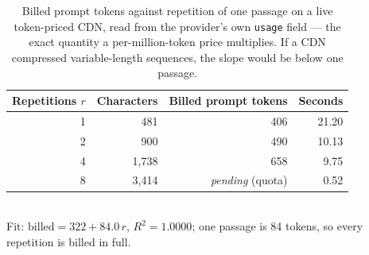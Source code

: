 \begin{table}[htbp]
\centering
\caption{Billed prompt tokens against repetition of one passage on a live
token-priced CDN, read from the provider's own \texttt{usage} field --- the
exact quantity a per-million-token price multiplies. If a CDN compressed
variable-length sequences, the slope would be below one passage.}
\label{tab:cdn}
\begin{tabular}{rrrr}
\toprule
Repetitions $r$ & Characters & Billed prompt tokens & Seconds \\
\midrule
1 & 481 & 406 & 21.20 \\
2 & 900 & 490 & 10.13 \\
4 & 1,738 & 658 & 9.75 \\
8 & 3,414 & \emph{pending} (quota) & 0.52 \\

\bottomrule
\end{tabular}
\\[0.4em]
Fit: $\mathrm{billed} = 322 + 84.0\,r$, $R^2=1.0000$; one passage is 84 tokens, so every repetition is billed in full.

\end{table}
